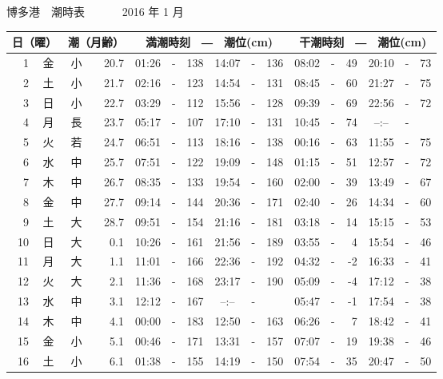 \documentclass[12pt.a4j]{jsarticle}
\begin{document}
\pagestyle{empty}
 \begin{center}
 {\LARGE 博多港　潮時表　　　}
 {\large 2016 年  1 月}\\
 \begin{table}[ht]
    \begin{tabular}{|rc|cr|ccrccr|ccrccr|}
    \hline
    \multicolumn{2}{|c|}{日（曜）} & \multicolumn{2}{c|}{潮（月齢）} & \multicolumn{6}{c|}{満潮時刻　―　潮位(cm)} & \multicolumn{6}{c|}{干潮時刻　―　潮位(cm)} \\
 \hline
 1 & 金 & 小 & 20.7 &  01:26 &-& 138  &  14:07 &-& 136  &   08:02 &-&  49  &   20:10 &-&  73  \\
 2 & 土 & 小 & 21.7 &  02:16 &-& 123  &  14:54 &-& 131  &   08:45 &-&  60  &   21:27 &-&  75  \\
 3 & 日 & 小 & 22.7 &  03:29 &-& 112  &  15:56 &-& 128  &   09:39 &-&  69  &   22:56 &-&  72  \\
 4 & 月 & 長 & 23.7 &  05:17 &-& 107  &  17:10 &-& 131  &   10:45 &-&  74  &   --:-- &-&     \\
 5 & 火 & 若 & 24.7 &  06:51 &-& 113  &  18:16 &-& 138  &   00:16 &-&  63  &   11:55 &-&  75  \\
 6 & 水 & 中 & 25.7 &  07:51 &-& 122  &  19:09 &-& 148  &   01:15 &-&  51  &   12:57 &-&  72  \\
 7 & 木 & 中 & 26.7 &  08:35 &-& 133  &  19:54 &-& 160  &   02:00 &-&  39  &   13:49 &-&  67  \\
 8 & 金 & 中 & 27.7 &  09:14 &-& 144  &  20:36 &-& 171  &   02:40 &-&  26  &   14:34 &-&  60  \\
 9 & 土 & 大 & 28.7 &  09:51 &-& 154  &  21:16 &-& 181  &   03:18 &-&  14  &   15:15 &-&  53  \\
10 & 日 & 大 &  0.1 &  10:26 &-& 161  &  21:56 &-& 189  &   03:55 &-&   4  &   15:54 &-&  46  \\
11 & 月 & 大 &  1.1 &  11:01 &-& 166  &  22:36 &-& 192  &   04:32 &-&  -2  &   16:33 &-&  41  \\
12 & 火 & 大 &  2.1 &  11:36 &-& 168  &  23:17 &-& 190  &   05:09 &-&  -4  &   17:12 &-&  38  \\
13 & 水 & 中 &  3.1 &  12:12 &-& 167  &  --:-- &-&     &   05:47 &-&  -1  &   17:54 &-&  38  \\
14 & 木 & 中 &  4.1 &  00:00 &-& 183  &  12:50 &-& 163  &   06:26 &-&   7  &   18:42 &-&  41  \\
15 & 金 & 小 &  5.1 &  00:46 &-& 171  &  13:31 &-& 157  &   07:07 &-&  19  &   19:38 &-&  46  \\
16 & 土 & 小 &  6.1 &  01:38 &-& 155  &  14:19 &-& 150  &   07:54 &-&  35  &   20:47 &-&  50  \\

\end{tabular}
\end{table}
\end{center}
\end{document}
